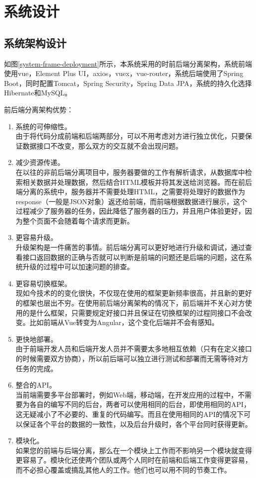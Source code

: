 
\chapter{系统设计}

\label{系统设计}


\section{系统架构设计}

如图\ref{system-frame-deployment}所示，本系统采用的时前后端分离架构，系统前端使用vue，Element Plus UI，axios，vuex，vue-router，系统后端使用了Spring Boot，同时配置Tomcat，Spring Security，Spring Data JPA，系统的持久化选择Hibernate和MySQL。

前后端分离架构优势：
\begin{enumerate}
    \item 系统的可伸缩性。\\由于将代码分成前端和后端两部分，可以不用考虑对方进行独立优化，只要保证数据接口不改变，那么双方的交互就不会出现问题。
    \item 减少资源传递。\\在以往的非前后端分离项目中，服务器要做的工作有解析请求，从数据库中检索相关数据并处理数据，然后结合HTML模板并将其发送给浏览器。而在前后端分离的系统中，服务器并不需要处理HTML，之需要将处理好的数据作为response（一般是JSON对象）返还给前端，而前端根据数据进行展示，这个过程减少了服务器的任务，因此降低了服务器的压力，并且用户体验更好，因为整个页面不会随着每个请求而更新。
    \item 更容易升级。\\升级架构是一件痛苦的事情。前后端分离可以更好地进行升级和调试，通过查看接口返回数据的正确与否就可以判断是前端的问题还是后端的问题，这在系统升级的过程中可以加速问题的排查。
    \item 更容易切换框架。\\现如今技术的的变化很快，不仅现在使用的框架更新频率很高，并且新的更好的框架也层出不穷。在使用前后端分离架构的情况下，前后端并不关心对方使用的是什么框架，只需要规定好接口并且保证在切换框架的过程同接口不会改变。比如前端从Vue转变为Angular，这个变化后端并不会有感知。
    \item 更快地部署。\\由于前端开发人员和后端开发人员并不需要太多地相互依赖（只有在定义接口的时候需要双方协商），所以前后端可以独立进行测试和部署而无需等待对方任务的完成。
    \item 整合的API。\\当前端需要多平台部署时，例如Web端，移动端，在开发应用的过程中，不需要为各自的编写不同的后台，两者可以使用相同的后台，即使用相同的API，这无疑减小了不必要的、重复的代码编写。而且在使用相同的API的情况下可以保证各个平台的数据的一致性，以及后台升级时，各个平台同时获得更新。
    \item 模块化。\\如果您的前端与后端分离，那么在一个模块上工作而不影响另一个模块就变得更容易了。模块化还使两个团队或两个人同时在前端和后端工作变得更容易，而不必担心覆盖或搞乱其他人的工作。他们也可以用不同的节奏工作。
\end{enumerate}

